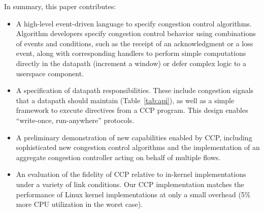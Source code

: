 \vspace{0.1in}
In summary, this paper contributes:

\begin{itemize}
\item A high-level event-driven language to specify congestion control
  algorithms. Algorithm developers specify congestion control behavior using
  combinations of events and conditions, such as the receipt of an
  acknowledgment or a loss event, along with corresponding handlers to perform
  simple computations directly in the datapath (\eg increment a window) or defer
  complex logic to a userspace component.

\item A specification of datapath responsibilities. These include congestion
  signals that a datapath should maintain (Table~\ref{tab:api}), as
  well as a simple framework to execute directives from a CCP program. This
  design enables ``write-once, run-anywhere'' protocols.

\item A preliminary demonstration of new capabilities enabled by CCP, including
  sophisticated new congestion control algorithms and the implementation of an
  aggregate congestion controller acting on behalf of multiple flows.

\item An evaluation of the fidelity of CCP relative to in-kernel
  implementations under a variety of link conditions. Our CCP implementation
  matches the performance of Linux kernel implementations at only a small
  overhead (5\% more CPU utilization in the worst case).

\end{itemize}

